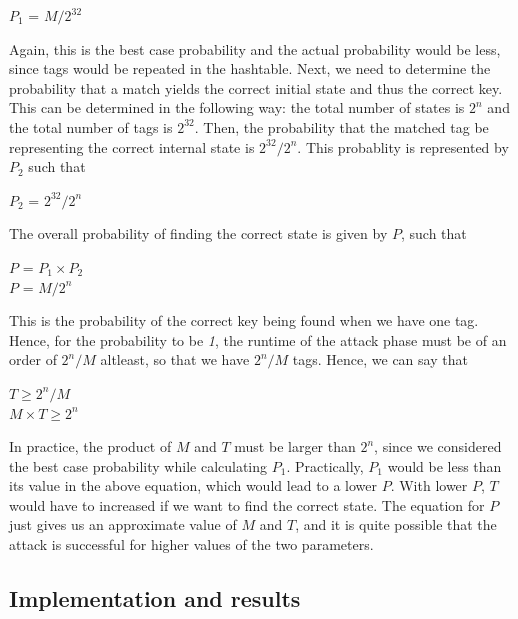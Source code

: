 \begin{center}
\large{$P_1$ = $M/2^{32}$}
\end{center}

Again, this is the best case probability and the actual probability would be less, since tags would be repeated in the hashtable. Next, we need to determine the probability that a match yields the correct initial state and thus the correct key. This can be determined in the following way: the total number of states is $2^n$ and the total number of tags is $2^{32}$. Then, the probability that the matched tag be representing the correct internal state is $2^{32}/2^n$. This probablity is represented by $P_2$ such that

\begin{center}
\large{$P_2$ = $2^{32}/2^n$}
\end{center}

The overall probability of finding the correct state is given by $P$, such that

\begin{center}
\large{$P$ = $P_1 \times P_2$}\\
\large{$P$ = $M/2^{n}$}\\
\end{center}

This is the probability of the correct key being found when we have one tag. Hence, for the probability to be \emph{1}, the runtime of the attack phase must be of an order of $2^{n}/M$ altleast, so that we have $2^{n}/M$ tags. Hence, we can say that

\begin{center}
\large{$T \geq 2^{n}/M$}\\
\large{$M \times T \geq 2^{n}$}
\end{center}

In practice, the product of $M$ and $T$ must be larger than $2^n$, since we considered the best case probability while calculating $P_1$. Practically, $P_1$ would be less than its value in the above equation, which would lead to a lower $P$. With lower $P$, $T$ would have to increased if we want to find the correct state. The equation for $P$ just gives us an approximate value of $M$ and $T$, and it is quite possible that the attack is successful for higher values of the two parameters.


\subsection{Implementation and results}

